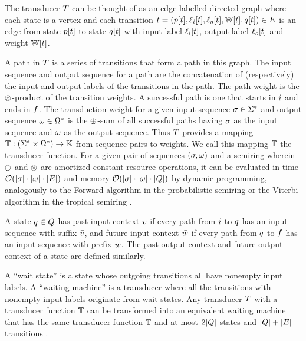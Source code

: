 \documentclass[english]{article}
\begin{document}
The transducer $T$ can be thought of as an edge-labelled directed graph
where each state is a vertex
and each transition
$t = (p[t],\ell_i[t],\ell_o[t],\mathbb{W}[t],q[t]) \in E$
is an edge from state $p[t]$ to state $q[t]$
with input label $\ell_i[t]$,
output label $\ell_o[t]$
and weight $\mathbb{W}[t]$.

A path in $T$ is a series of transitions that form a path in this graph.
The input sequence and output sequence for a path are the concatenation of (respectively)
the input and output labels of the transitions in the path.
The path weight is the $\otimes$-product of the transition weights.
A successful path is one that starts in $i$ and ends in $f$.
The transduction weight for a given input sequence $\sigma \in {\Sigma}^{\ast}$
and output sequence $\omega \in {\Omega}^{\ast}$
is the $\oplus$-sum of all successful paths
having $\sigma$ as the input sequence
and $\omega$ as the output sequence.
Thus $T$ provides a mapping
$\mathbb{T}:({\Sigma}^{\ast} \times {\Omega}^{\ast}) \to \mathbb{K}$
from sequence-pairs to weights.
We call this mapping $\mathbb{T}$ the transducer function.
For a given pair of sequences $(\sigma,\omega)$
and a semiring wherein $\oplus$ and $\otimes$ are amortized-constant resource operations,
it can be evaluated in time ${\cal O}(|\sigma| \cdot |\omega| \cdot |E|)$
and memory ${\cal O}(|\sigma| \cdot |\omega| \cdot |Q|)$
by dynamic programming,
analogously to the Forward algorithm in the probabilistic semiring
or the Viterbi algorithm in the tropical semiring
\cite{Durbin98}.

A state $q \in Q$ has past input context $\bar{v}$ if every path from $i$ to $q$ has an input sequence with suffix $\bar{v}$,
and future input context $\bar{w}$ if every path from $q$ to $f$ has an input sequence with prefix $\bar{w}$.
The past output context and future output context of a state are defined similarly.

A ``wait state'' is a state whose outgoing transitions all have nonempty input labels.
A ``waiting machine'' is a transducer where all the transitions with nonempty input labels
originate from wait states.
Any transducer $T$ with a transducer function $\mathbb{T}$
can be transformed into an equivalent waiting machine
that has the same transducer function $\mathbb{T}$ and
at most $2|Q|$ states and $|Q|+|E|$ transitions
\cite{WestessonEtAlArxiv2012}.
\end{document}
